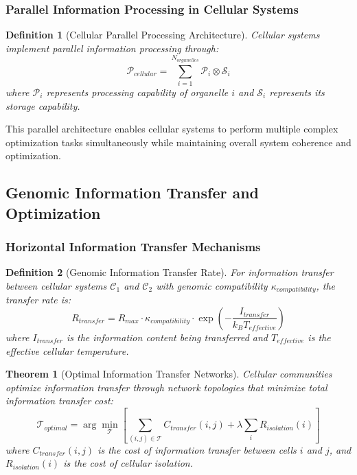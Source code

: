 \documentclass[12pt,a4paper]{article}
\newtheorem{theorem}{Theorem}
\newtheorem{definition}{Definition}
\begin{document}
\subsubsection{Parallel Information Processing in Cellular Systems}

\begin{definition}[Cellular Parallel Processing Architecture]
Cellular systems implement parallel information processing through:
\begin{equation}
\mathcal{P}_{cellular} = \sum_{i=1}^{N_{organelles}} \mathcal{P}_i \otimes \mathcal{S}_i
\end{equation}
where $\mathcal{P}_i$ represents processing capability of organelle $i$ and $\mathcal{S}_i$ represents its storage capability.
\end{definition}

This parallel architecture enables cellular systems to perform multiple complex optimization tasks simultaneously while maintaining overall system coherence and optimization.

\subsection{Genomic Information Transfer and Optimization}

\subsubsection{Horizontal Information Transfer Mechanisms}

\begin{definition}[Genomic Information Transfer Rate]
For information transfer between cellular systems $\mathcal{C}_1$ and $\mathcal{C}_2$ with genomic compatibility $\kappa_{compatibility}$, the transfer rate is:
\begin{equation}
R_{transfer} = R_{max} \cdot \kappa_{compatibility} \cdot \exp\left(-\frac{I_{transfer}}{k_B T_{effective}}\right)
\end{equation}
where $I_{transfer}$ is the information content being transferred and $T_{effective}$ is the effective cellular temperature.
\end{definition}

\begin{theorem}[Optimal Information Transfer Networks]
Cellular communities optimize information transfer through network topologies that minimize total information transfer cost:
\begin{equation}
\mathcal{T}_{optimal} = \arg\min_{\mathcal{T}} \left[ \sum_{(i,j) \in \mathcal{T}} C_{transfer}(i,j) + \lambda \sum_{i} R_{isolation}(i) \right]
\end{equation}
where $C_{transfer}(i,j)$ is the cost of information transfer between cells $i$ and $j$, and $R_{isolation}(i)$ is the cost of cellular isolation.
\end{theorem}
\end{document}
